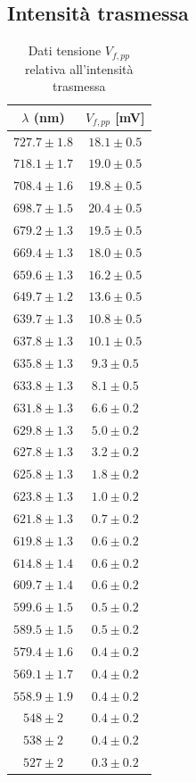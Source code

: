 \newpage
\subsection{Intensità trasmessa}

\begin{table}[h]
\centering
\begin{tabular}{|c|c|}
\hline
$\lambda$ (nm) & $V_{f,pp}$ [mV] \\
\hline\hline
$727.7 \pm 1.8$ & $18.1 \pm 0.5$ \\
\hline
$718.1 \pm 1.7$ & $19.0 \pm 0.5$ \\
\hline
$708.4 \pm 1.6$ & $19.8 \pm 0.5$ \\
\hline
$698.7 \pm 1.5$ & $20.4 \pm 0.5$ \\
\hline
$679.2 \pm 1.3$ & $19.5 \pm 0.5$ \\
\hline
$669.4 \pm 1.3$ & $18.0 \pm 0.5$ \\
\hline
$659.6 \pm 1.3$ & $16.2 \pm 0.5$ \\
\hline
$649.7 \pm 1.2$ & $13.6 \pm 0.5$ \\
\hline
$639.7 \pm 1.3$ & $10.8 \pm 0.5$ \\
\hline
$637.8 \pm 1.3$ & $10.1 \pm 0.5$ \\
\hline
$635.8 \pm 1.3$ & $9.3 \pm 0.5$ \\
\hline
$633.8 \pm 1.3$ & $8.1 \pm 0.5$ \\
\hline
$631.8 \pm 1.3$ & $6.6 \pm 0.2$ \\
\hline
$629.8 \pm 1.3$ & $5.0 \pm 0.2$ \\
\hline
$627.8 \pm 1.3$ & $3.2 \pm 0.2$ \\
\hline
$625.8 \pm 1.3$ & $1.8 \pm 0.2$ \\
\hline
$623.8 \pm 1.3$ & $1.0 \pm 0.2$ \\
\hline
$621.8 \pm 1.3$ & $0.7 \pm 0.2$ \\
\hline
$619.8 \pm 1.3$ & $0.6 \pm 0.2$ \\
\hline
$614.8 \pm 1.4$ & $0.6 \pm 0.2$ \\
\hline
$609.7 \pm 1.4$ & $0.6 \pm 0.2$ \\
\hline
$599.6 \pm 1.5$ & $0.5 \pm 0.2$ \\
\hline
$589.5 \pm 1.5$ & $0.5 \pm 0.2$ \\
\hline
$579.4 \pm 1.6$ & $0.4 \pm 0.2$ \\
\hline
$569.1 \pm 1.7$ & $0.4 \pm 0.2$ \\
\hline
$558.9 \pm 1.9$ & $0.4 \pm 0.2$ \\
\hline
$548 \pm 2$ & $0.4 \pm 0.2$ \\
\hline
$538 \pm 2$ & $0.4 \pm 0.2$ \\
\hline
$527 \pm 2$ & $0.3 \pm 0.2$ \\
\hline
\end{tabular}
\caption{Dati tensione $V_{f,pp}$ relativa all'intensità trasmessa}
\end{table}
\newpage
